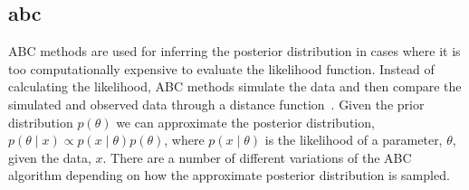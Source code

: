 \subsection{\acrfull{abc}}
\label{sec:abc}


ABC methods are used for inferring the posterior distribution in cases where it is too computationally expensive to evaluate the likelihood function. Instead of calculating the likelihood, ABC methods simulate the data and then compare the simulated and observed data through a distance function~\autocite{Toni:2009tr}. Given the prior distribution $p(\theta)$ we can approximate the posterior distribution, $p(\theta\mid x)\propto p(x\mid\theta)p(\theta)$, where $p(x\mid\theta)$ is the likelihood of a parameter, $\theta$, given the data, $x$. There are a number of different variations of the ABC algorithm depending on how the approximate posterior distribution is sampled. 


